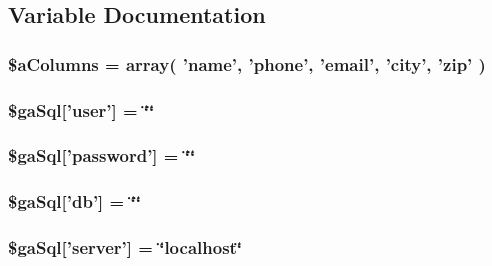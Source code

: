 \subsection{Variable Documentation}
\hypertarget{infinite_scroll_8php_aba12f5ba193beb8beb9fdd0a758711e8}{
\subsubsection[{\$a\+Columns}]{\setlength{\rightskip}{0pt plus 5cm}\$a\+Columns = array( 'name', 'phone', 'email', 'city', 'zip' )}}\label{infinite_scroll_8php_aba12f5ba193beb8beb9fdd0a758711e8}
\hypertarget{infinite_scroll_8php_a08fc9fba5bf358871d1f80066f8930d1}{
\subsubsection[{\$ga\+Sql}]{\setlength{\rightskip}{0pt plus 5cm}\$ga\+Sql\mbox{[}'user'\mbox{]} = \char`\"{}\char`\"{}}}\label{infinite_scroll_8php_a08fc9fba5bf358871d1f80066f8930d1}
\hypertarget{infinite_scroll_8php_a5a7f7a53d25bfc58a76a0132750c80eb}{
\subsubsection[{\$ga\+Sql}]{\setlength{\rightskip}{0pt plus 5cm}\$ga\+Sql\mbox{[}'password'\mbox{]} = \char`\"{}\char`\"{}}}\label{infinite_scroll_8php_a5a7f7a53d25bfc58a76a0132750c80eb}
\hypertarget{infinite_scroll_8php_aaa5ffcba6d18eacf65c42024605b6486}{
\subsubsection[{\$ga\+Sql}]{\setlength{\rightskip}{0pt plus 5cm}\$ga\+Sql\mbox{[}'db'\mbox{]} = \char`\"{}\char`\"{}}}\label{infinite_scroll_8php_aaa5ffcba6d18eacf65c42024605b6486}
\hypertarget{infinite_scroll_8php_a23a651ce4e9cd3741cb88709c0bfdf8e}{
\subsubsection[{\$ga\+Sql}]{\setlength{\rightskip}{0pt plus 5cm}\$ga\+Sql\mbox{[}'server'\mbox{]} = \char`\"{}localhost\char`\"{}}}\label{infinite_scroll_8php_a23a651ce4e9cd3741cb88709c0bfdf8e}
